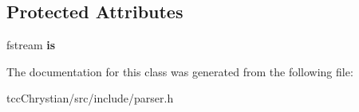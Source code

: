 \subsection*{Protected Attributes}
\begin{DoxyCompactItemize}
\item 
\hypertarget{classParser_a74c323dd4798b459fa982295b8e871bc}{fstream {\bfseries is}}\label{classParser_a74c323dd4798b459fa982295b8e871bc}

\end{DoxyCompactItemize}


The documentation for this class was generated from the following file\-:\begin{DoxyCompactItemize}
\item 
tcc\-Chrystian/src/include/parser.\-h\end{DoxyCompactItemize}

